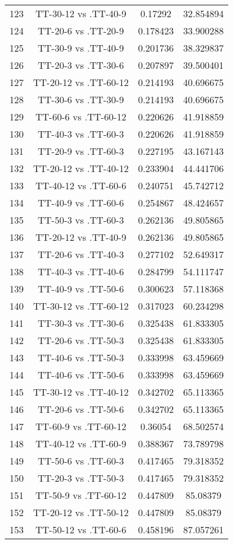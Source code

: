 \documentclass[a4paper,10pt]{article}
\begin{document}
\begin{landscape}
\begin{table}[!htp]
\begin{tabular}{cccc}
123&TT-30-12 vs .TT-40-9&0.17292&32.854894\\
124&TT-20-6 vs .TT-20-9&0.178423&33.900288\\
125&TT-30-9 vs .TT-40-9&0.201736&38.329837\\
126&TT-20-3 vs .TT-30-6&0.207897&39.500401\\
127&TT-20-12 vs .TT-60-12&0.214193&40.696675\\
128&TT-30-6 vs .TT-30-9&0.214193&40.696675\\
129&TT-60-6 vs .TT-60-12&0.220626&41.918859\\
130&TT-40-3 vs .TT-60-3&0.220626&41.918859\\
131&TT-20-9 vs .TT-60-3&0.227195&43.167143\\
132&TT-20-12 vs .TT-40-12&0.233904&44.441706\\
133&TT-40-12 vs .TT-60-6&0.240751&45.742712\\
134&TT-40-9 vs .TT-60-6&0.254867&48.424657\\
135&TT-50-3 vs .TT-60-3&0.262136&49.805865\\
136&TT-20-12 vs .TT-40-9&0.262136&49.805865\\
137&TT-20-6 vs .TT-40-3&0.277102&52.649317\\
138&TT-40-3 vs .TT-40-6&0.284799&54.111747\\
139&TT-40-9 vs .TT-50-6&0.300623&57.118368\\
140&TT-30-12 vs .TT-60-12&0.317023&60.234298\\
141&TT-30-3 vs .TT-30-6&0.325438&61.833305\\
142&TT-20-6 vs .TT-50-3&0.325438&61.833305\\
143&TT-40-6 vs .TT-50-3&0.333998&63.459669\\
144&TT-40-6 vs .TT-50-6&0.333998&63.459669\\
145&TT-30-12 vs .TT-40-12&0.342702&65.113365\\
146&TT-20-6 vs .TT-50-6&0.342702&65.113365\\
147&TT-60-9 vs .TT-60-12&0.36054&68.502574\\
148&TT-40-12 vs .TT-60-9&0.388367&73.789798\\
149&TT-50-6 vs .TT-60-3&0.417465&79.318352\\
150&TT-20-3 vs .TT-50-3&0.417465&79.318352\\
151&TT-50-9 vs .TT-60-12&0.447809&85.08379\\
152&TT-20-12 vs .TT-50-12&0.447809&85.08379\\
153&TT-50-12 vs .TT-60-6&0.458196&87.057261\\

\end{tabular}
\end{table}
\end{landscape}
\end{document}
